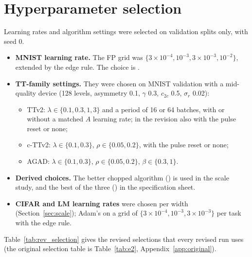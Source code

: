 \section{Hyperparameter selection}\label{app:selection}
Learning rates and algorithm settings were selected on validation splits only, with seed 0.
\begin{itemize}
\item \textbf{MNIST learning rate.} The FP grid was $\{3\times10^{-4},10^{-3},3\times10^{-3},10^{-2}\}$, extended by the edge
      rule. The choice is \RLrMnist{}.
\item \textbf{TT-family settings.} They were chosen on MNIST validation with a mid-quality device (128 levels, asymmetry 0.1,
      $\gamma$ 0.3, $c_{2c}$ 0.5, $\sigma_r$ 0.02):
      \begin{itemize}
      \item TTv2: $\lambda\in\{0.1,0.3,1,3\}$ and a period of 16 or 64 batches, with or without a matched $A$ learning rate;
            in the revision also with the pulse reset or none;
      \item c-TTv2: $\lambda\in\{0.1,0.3\}$, $\rho\in\{0.05,0.2\}$, with the pulse reset or none;
      \item AGAD: $\lambda\in\{0.1,0.3\}$, $\rho\in\{0.05,0.2\}$, $\beta\in\{0.3,1\}$.
      \end{itemize}
\item \textbf{Derived choices.} The better chopped algorithm (\RETwoBestchopped{}) is used in the scale study, and the best of
      the three (\RETwoSalgo{}) in the specification sheet.
\item \textbf{CIFAR and LM learning rates} were chosen per width (Section~\ref{sec:scale}); Adam's on a grid of
      $\{3\times10^{-4},10^{-3},3\times10^{-3}\}$ per task with the edge rule.
\end{itemize}

Table~\ref{tab:rev_selection} gives the revised selections that every revised run uses (the original selection table is Table~\ref{tab:e2}, Appendix~\ref{app:original}).


